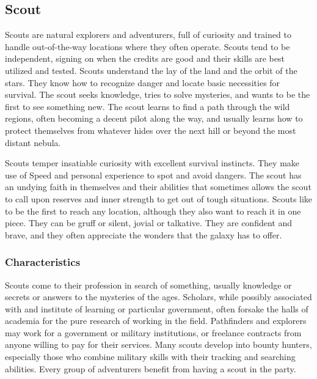 \documentclass[a4paper,10pt,final,twocolumn,oneside]{book}
\begin{document}

\subsection{Scout} %
\label{sub:scout}

Scouts are natural explorers and adventurers, full of curiosity and trained to handle out-of-the-way locations where they often operate. Scouts tend to be independent, signing on when the credits are good and their skills are best utilized and tested. Scouts understand the lay of the land and the orbit of the stars. They know how to recognize danger and locate basic necessities for survival. The scout seeks knowledge, tries to solve mysteries, and wants to be the first to see something new. The scout learns to find a path through the wild regions, often becoming a decent pilot along the way, and usually learns how to protect themselves from whatever hides over the next hill or beyond the most distant nebula.

Scouts temper insatiable curiosity with excellent survival instincts. They make use of Speed and personal experience to spot and avoid dangers. The scout has an undying faith in themselves and their abilities that sometimes allows the scout to call upon reserves and inner strength to get out of tough situations. Scouts like to be the first to reach any location, although they also want to reach it in one piece. They can be gruff or silent, jovial or talkative. They are confident and brave, and they often appreciate the wonders that the galaxy has to offer.

\subsubsection*{Characteristics}
\label{subsub:scoutCharacteristics}

Scouts come to their profession in search of something, usually knowledge or secrets or answers to the mysteries of the ages. Scholars, while possibly associated with and institute of learning or particular government, often forsake the halls of academia for the pure research of working in the field. Pathfinders and explorers may work for a government or military institutions, or freelance contracts from anyone willing to pay for their services. Many scouts develop into bounty hunters, especially those who combine military skills with their tracking and searching abilities. Every group of adventurers benefit from having a scout in the party.
\end{document}
